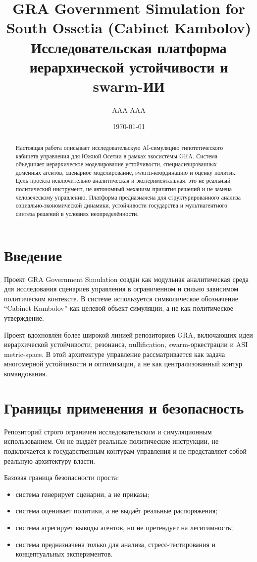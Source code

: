 \documentclass[11pt,a4paper]{article}
\title{\textbf{GRA Government Simulation for South Ossetia (Cabinet Kambolov)}\\
\large Исследовательская платформа иерархической устойчивости и swarm-ИИ}
\author{AAA AAA}
\date{\today}
\begin{document}
\maketitle

\begin{abstract}
Настоящая работа описывает исследовательскую AI-симуляцию гипотетического кабинета управления для Южной Осетии в рамках экосистемы GRA. Система объединяет иерархическое моделирование устойчивости, специализированных доменных агентов, сценарное моделирование, swarm-координацию и оценку политик. Цель проекта исключительно аналитическая и экспериментальная: это не реальный политический инструмент, не автономный механизм принятия решений и не замена человеческому управлению. Платформа предназначена для структурированного анализа социально-экономической динамики, устойчивости государства и мультиагентного синтеза решений в условиях неопределённости.
\end{abstract}

\section{Введение}

Проект GRA Government Simulation создан как модульная аналитическая среда для исследования сценариев управления в ограниченном и сильно зависимом политическом контексте. В системе используется символическое обозначение ``Cabinet Kambolov'' как целевой объект симуляции, а не как политическое утверждение.

Проект вдохновлён более широкой линией репозиториев GRA, включающих идеи иерархической устойчивости, резонанса, nullification, swarm-оркестрации и ASI metric-space. В этой архитектуре управление рассматривается как задача многомерной устойчивости и оптимизации, а не как централизованный контур командования.

\section{Границы применения и безопасность}

Репозиторий строго ограничен исследовательским и симуляционным использованием. Он не выдаёт реальные политические инструкции, не подключается к государственным контурам управления и не представляет собой реальную архитектуру власти.

Базовая граница безопасности проста:

\begin{itemize}[leftmargin=1.5em]
    \item система генерирует сценарии, а не приказы;
    \item система оценивает политики, а не выдаёт реальные распоряжения;
    \item система агрегирует выводы агентов, но не претендует на легитимность;
    \item система предназначена только для анализа, стресс-тестирования и концептуальных экспериментов.
\end{itemize}
\end{document}

